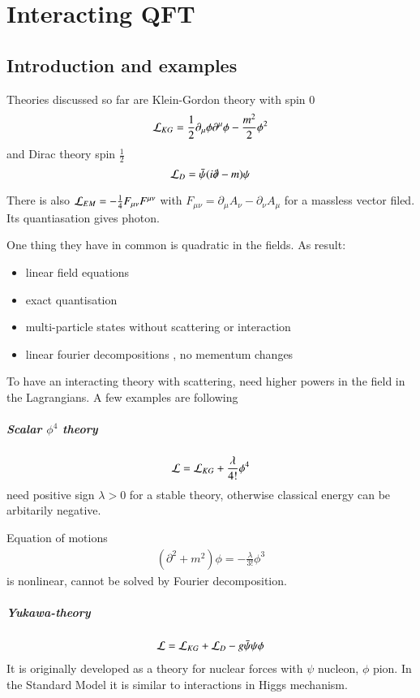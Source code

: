 \chapter{Interacting QFT}
\section{Introduction and examples}
Theories discussed so far are Klein-Gordon theory with spin $0$ 
$$\mathcal{L}_{KG} = \frac{1}{2}\partial_\mu\phi\partial^\mu\phi - \frac{m^2}{2}\phi^2$$ 
and Dirac theory spin $\frac{1}{2}$ 
$$\mathcal{L}_D = \bar{\psi}(i\slashed{\partial} - m) \psi $$

There is also $\mathcal{L}_{EM} = -\frac{1}{4}F_{\mu\nu}F^{\mu\nu}$ with $F_{\mu\nu} = \partial_\mu A_\nu - \partial_\nu A_\mu$ for a massless vector filed. Its quantiasation gives photon.

One thing they have in common is quadratic in the fields. As result:
\begin{itemize}
	\item linear field equations
	\item exact quantisation
	\item multi-particle states without scattering or interaction
	\item linear fourier decompositions , no mementum changes
\end{itemize}

To have an interacting theory with scattering, need higher powers in the field in the Lagrangians. A few examples are following
\paragraph{Scalar $\phi^4$ theory}
\begin{align*}
	\mathcal{L} = \mathcal{L}_{KG} + \frac{\lambda}{4!} \phi^4
\end{align*}
need positive sign $\lambda > 0$ for a stable theory, otherwise classical energy can be arbitarily negative.

Equation of motions
\begin{align*}
	(\partial^2+ m ^2) \phi = -\frac{\lambda}{3!} \phi^3
\end{align*}
is nonlinear, cannot be solved by Fourier decomposition.

\paragraph{Yukawa-theory}
\begin{align*}
	\mathcal{L} = \mathcal{L}_{KG} + \mathcal{L}_{D} - g \bar{\psi}\psi \phi
\end{align*}
It is originally developed as a theory for nuclear forces with $\psi$ nucleon, $\phi$ pion. In the Standard Model it is similar to interactions in Higgs mechanism.
